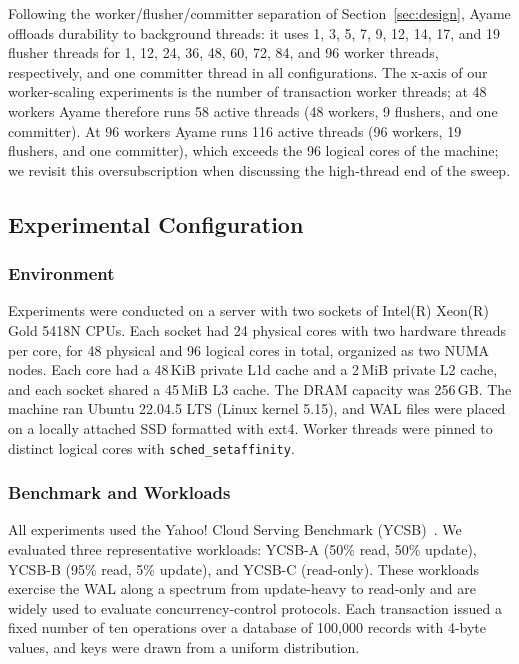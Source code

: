 Following the worker/flusher/committer separation of
Section~\ref{sec:design}, Ayame offloads durability to background
threads: it uses 1, 3, 5, 7, 9, 12, 14, 17, and 19 flusher threads for 1,
12, 24, 36, 48, 60, 72, 84, and 96 worker threads, respectively, and one
committer thread in all configurations.  The x-axis of our worker-scaling
experiments is the number of transaction worker threads; at 48 workers
Ayame therefore runs 58 active threads (48 workers, 9 flushers, and one
committer).  At 96 workers Ayame runs 116 active threads (96 workers, 19
flushers, and one committer), which exceeds the 96 logical cores of the
machine; we revisit this oversubscription when discussing the high-thread
end of the sweep.

\subsection{Experimental Configuration}
\label{sec:config}

\subsubsection{Environment}
\label{sec:env}

Experiments were conducted on a server with two sockets of Intel(R)
Xeon(R) Gold 5418N CPUs.  Each socket had 24 physical cores with two
hardware threads per core, for 48 physical and 96 logical cores in
total, organized as two NUMA nodes.  Each core had a 48\,KiB private L1d
cache and a 2\,MiB private L2 cache, and each socket shared a 45\,MiB L3
cache.  The DRAM capacity was 256\,GB.  The machine ran Ubuntu 22.04.5
LTS (Linux kernel 5.15), and WAL files were placed on a locally attached
SSD formatted with ext4.  Worker threads were pinned to distinct logical
cores with \texttt{sched\_setaffinity}.

\subsubsection{Benchmark and Workloads}
\label{sec:workloads}

All experiments used the Yahoo! Cloud Serving Benchmark
(YCSB)~\cite{cooper2010ycsb}.  We evaluated three representative workloads:
YCSB-A (50\% read, 50\% update), YCSB-B (95\% read, 5\% update), and
YCSB-C (read-only).  These workloads exercise the WAL along a spectrum
from update-heavy to read-only and are widely used to evaluate
concurrency-control protocols.  Each transaction issued a fixed number
of ten operations over a database of 100{,}000 records with 4-byte
values, and keys were drawn from a uniform distribution.

